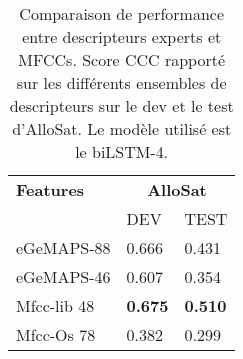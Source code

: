 \begin{table}[ht!]
    \centering
    \begin{tabular}{| l | l | l |}
    \hline
    \textbf{Features} &\multicolumn{2}{c|}{\textbf{AlloSat}} \\
    &DEV &TEST \\
    \hline
    eGeMAPS-88  &0.666  &0.431\\
    eGeMAPS-46  &0.607  &0.354\\
    Mfcc-lib 48    &\textbf{0.675}  &\textbf{0.510}\\
    Mfcc-Os 78    &0.382  &0.299\\
    \hline
\end{tabular}
    \caption{Comparaison de performance entre descripteurs experts et MFCCs. Score CCC rapporté sur les différents ensembles de descripteurs sur le dev et le test d'AlloSat. Le modèle utilisé est le biLSTM-4.}
    \label{tab:egemapsVSmfcc}
\end{table}
